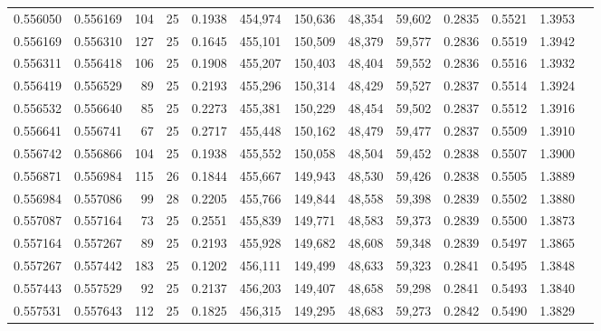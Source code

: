 \begin{tabular}{rrrrrrrrrrrrr}
0.556050 & 0.556169 &   104 &  25 &                                     0.1938 & 454,974 & 150,636 &  48,354 &  59,602 & 0.2835 & 0.5521 & 1.3953 \\
0.556169 & 0.556310 &   127 &  25 &                                     0.1645 & 455,101 & 150,509 &  48,379 &  59,577 & 0.2836 & 0.5519 & 1.3942 \\
0.556311 & 0.556418 &   106 &  25 &                                     0.1908 & 455,207 & 150,403 &  48,404 &  59,552 & 0.2836 & 0.5516 & 1.3932 \\
0.556419 & 0.556529 &    89 &  25 &                                     0.2193 & 455,296 & 150,314 &  48,429 &  59,527 & 0.2837 & 0.5514 & 1.3924 \\
0.556532 & 0.556640 &    85 &  25 &                                     0.2273 & 455,381 & 150,229 &  48,454 &  59,502 & 0.2837 & 0.5512 & 1.3916 \\
0.556641 & 0.556741 &    67 &  25 &                                     0.2717 & 455,448 & 150,162 &  48,479 &  59,477 & 0.2837 & 0.5509 & 1.3910 \\
0.556742 & 0.556866 &   104 &  25 &                                     0.1938 & 455,552 & 150,058 &  48,504 &  59,452 & 0.2838 & 0.5507 & 1.3900 \\
0.556871 & 0.556984 &   115 &  26 &                                     0.1844 & 455,667 & 149,943 &  48,530 &  59,426 & 0.2838 & 0.5505 & 1.3889 \\
0.556984 & 0.557086 &    99 &  28 &                                     0.2205 & 455,766 & 149,844 &  48,558 &  59,398 & 0.2839 & 0.5502 & 1.3880 \\
0.557087 & 0.557164 &    73 &  25 &                                     0.2551 & 455,839 & 149,771 &  48,583 &  59,373 & 0.2839 & 0.5500 & 1.3873 \\
0.557164 & 0.557267 &    89 &  25 &                                     0.2193 & 455,928 & 149,682 &  48,608 &  59,348 & 0.2839 & 0.5497 & 1.3865 \\
0.557267 & 0.557442 &   183 &  25 &                                     0.1202 & 456,111 & 149,499 &  48,633 &  59,323 & 0.2841 & 0.5495 & 1.3848 \\
0.557443 & 0.557529 &    92 &  25 &                                     0.2137 & 456,203 & 149,407 &  48,658 &  59,298 & 0.2841 & 0.5493 & 1.3840 \\
0.557531 & 0.557643 &   112 &  25 &                                     0.1825 & 456,315 & 149,295 &  48,683 &  59,273 & 0.2842 & 0.5490 & 1.3829 \\

\end{tabular}
